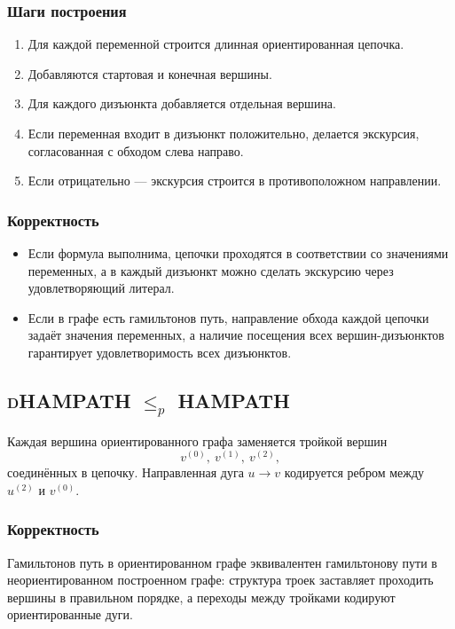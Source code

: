 \documentclass[12pt,a4paper]{article}
\theoremstyle{definition}
\theoremstyle{plain}
\begin{document}
\subsubsection*{Шаги построения}
\begin{enumerate}
\item Для каждой переменной строится длинная ориентированная цепочка.
\item Добавляются стартовая и конечная вершины.
\item Для каждого дизъюнкта добавляется отдельная вершина.
\item Если переменная входит в дизъюнкт положительно, делается экскурсия, согласованная с обходом слева направо.
\item Если отрицательно --- экскурсия строится в противоположном направлении.
\end{enumerate}

\subsubsection*{Корректность}
\begin{itemize}
\item Если формула выполнима, цепочки проходятся в соответствии со значениями переменных, а в каждый дизъюнкт можно сделать экскурсию через удовлетворяющий литерал.
\item Если в графе есть гамильтонов путь, направление обхода каждой цепочки задаёт значения переменных, а наличие посещения всех вершин-дизъюнктов гарантирует удовлетворимость всех дизъюнктов.
\end{itemize}

\subsection{\textsc{dHAMPATH} \texorpdfstring{$\le_p$}{<=p} \textsc{HAMPATH}}
Каждая вершина ориентированного графа заменяется тройкой вершин
\[
v^{(0)},\ v^{(1)},\ v^{(2)},
\]
соединённых в цепочку. Направленная дуга $u\to v$ кодируется ребром между $u^{(2)}$ и $v^{(0)}$.

\subsubsection*{Корректность}
Гамильтонов путь в ориентированном графе эквивалентен гамильтонову пути в неориентированном построенном графе: структура троек заставляет проходить вершины в правильном порядке, а переходы между тройками кодируют ориентированные дуги.
\end{document}
